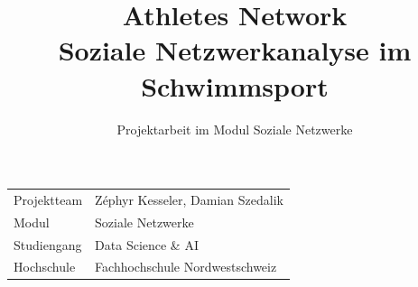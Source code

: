 \documentclass{fhnwreport}
\title{Athletes Network\\Soziale Netzwerkanalyse im Schwimmsport}
\author{Projektarbeit im Modul Soziale Netzwerke}
\date{\abgabedatum}
\newcommand{\projektteam}{Zéphyr Kesseler, Damian Szedalik}
\begin{document}
\maketitle
\vfill
\begin{tabularx}{\textwidth}{@{}lX@{}}
  Projektteam & \projektteam \\[2ex]
  Modul & Soziale Netzwerke \\[2ex]
  Studiengang & Data Science \& AI \\[2ex]
  Hochschule & Fachhochschule Nordwestschweiz
\end{tabularx}
\vfill
\clearpage

\tableofcontents
\clearpage












\clearpage
\printbibliography[heading=bibintoc,title=Literaturverzeichnis]

\end{document}
